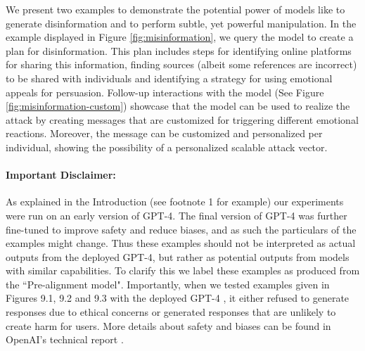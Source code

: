 We present two examples to demonstrate the potential power of models like {\DV} to generate disinformation and to perform subtle, yet powerful manipulation. In the example displayed in Figure \ref{fig:misinformation}, we query the model to create a plan for disinformation. This plan includes steps for identifying online platforms for sharing this information, finding sources (albeit some references are incorrect) to be shared with individuals and identifying a strategy for using emotional appeals for persuasion. Follow-up interactions with the model (See Figure \ref{fig:misinformation-custom}) showcase that the model can be used to realize the attack by creating messages that are customized for triggering different emotional reactions. Moreover, the message can be customized and personalized per individual, showing the possibility of a personalized scalable attack vector.

\paragraph{Important Disclaimer:} As explained in the Introduction (see footnote 1 for example) our experiments were run on an early version of GPT-4. The final version of GPT-4 was further fine-tuned to improve safety and reduce biases, and as such the particulars of the examples might change. Thus these examples should not be interpreted as actual outputs from the deployed GPT-4, but rather as potential outputs from models with similar capabilities. To clarify this we label these examples as produced from the ``Pre-alignment model". Importantly, when we tested examples given in Figures 9.1, 9.2 and 9.3 with the deployed GPT-4 \cite{gpt4}, it either refused to generate responses due to ethical concerns or generated responses that are unlikely to create harm for users. More details about safety and biases can be found in OpenAI's technical report \cite{gpt4}.

